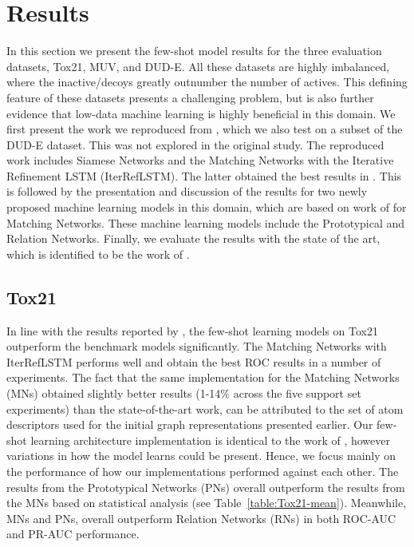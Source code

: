 \section{Results}

In this section we present the few-shot model results for the three evaluation datasets, Tox21, MUV, and DUD-E. All these datasets are highly imbalanced, where the inactive/decoys greatly outnumber the number of actives. This defining feature of these datasets presents a challenging problem, but is also further evidence that low-data machine learning is highly beneficial in this domain. We first present the work we reproduced from \citet{altae2017low}, which we also test on a subset of the DUD-E dataset. This was not explored in the original study. The reproduced work includes Siamese Networks \citep{koch2015siamese} and the Matching Networks \citep{vinyals2016matching} with the Iterative Refinement LSTM (IterRefLSTM). The latter obtained the best results in \citet{altae2017low}. This is followed by the presentation and discussion of the results for two newly proposed machine learning models in this domain, which are based on work of \citet{vinyals2016matching} for Matching Networks. These machine learning models include the Prototypical \citep{snell2017prototypical} and Relation \citep{sung2018learning} Networks. Finally, we evaluate the results with the state of the art, which is identified to be the work of \citet{altae2017low}.


\subsection{Tox21}

In line with the results reported by \citet{altae2017low}, the few-shot learning models on Tox21 outperform the benchmark models significantly. The Matching Networks with IterRefLSTM performs well and obtain the best ROC results in a number of experiments. The fact that the same implementation for the Matching Networks (MNs) obtained slightly better results (1-14\% across the five support set experiments) than the state-of-the-art work, can be attributed to the set of atom descriptors used for the initial graph representations presented earlier. Our few-shot learning architecture implementation is identical to the work of \citet{altae2017low}, however variations in how the model learns could be present. Hence, we focus mainly on the performance of how our implementations performed against each other. The results from the Prototypical Networks (PNs) overall outperform the results from the MNs based on statistical analysis (see Table~\ref{table:Tox21-mean}). Meanwhile, MNs and PNs, overall outperform Relation Networks (RNs) in both ROC-AUC and PR-AUC performance. 

